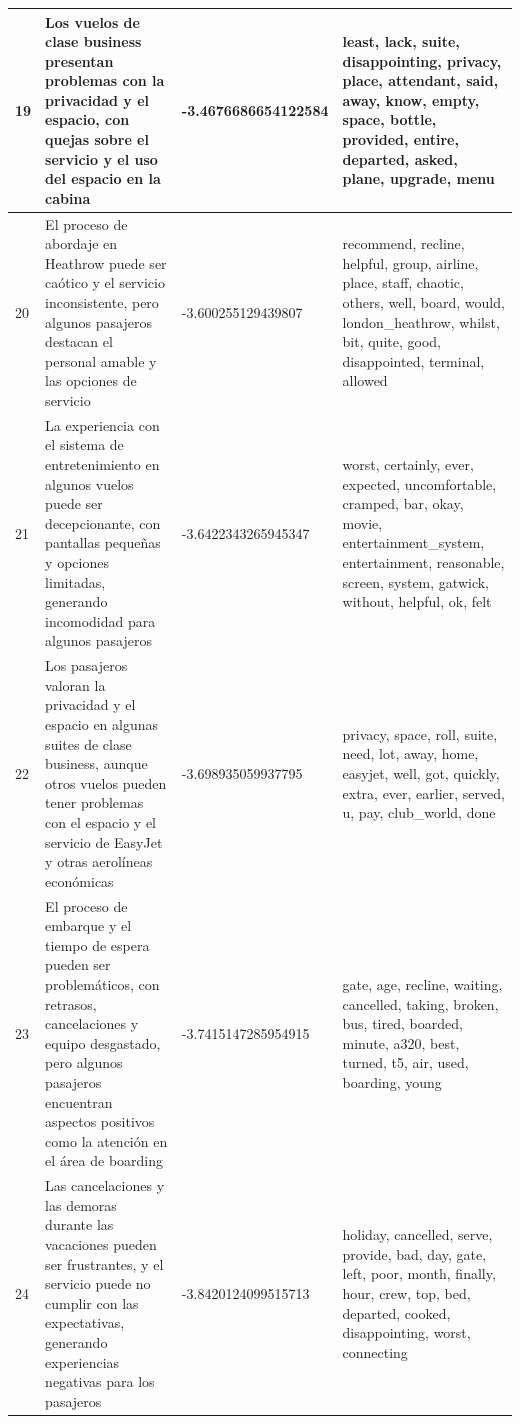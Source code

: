 \documentclass{report}
\begin{document}
{{\begin{longtable}{|p{1cm}|p{4cm}|p{4cm}|p{6cm}|}
                    \hline
                    19 & Los vuelos de clase business presentan problemas con la privacidad y el espacio, con quejas sobre el servicio y el uso del espacio en la cabina & -3.4676686654122584 & least, lack, suite, disappointing, privacy, place, attendant, said, away, know, empty, space, bottle, provided, entire, departed, asked, plane, upgrade, menu \\
                    \hline
                    20 & El proceso de abordaje en Heathrow puede ser caótico y el servicio inconsistente, pero algunos pasajeros destacan el personal amable y las opciones de servicio & -3.600255129439807 & recommend, recline, helpful, group, airline, place, staff, chaotic, others, well, board, would, london\_heathrow, whilst, bit, quite, good, disappointed, terminal, allowed \\
                    \hline
                    21 & La experiencia con el sistema de entretenimiento en algunos vuelos puede ser decepcionante, con pantallas pequeñas y opciones limitadas, generando incomodidad para algunos pasajeros & -3.6422343265945347 & worst, certainly, ever, expected, uncomfortable, cramped, bar, okay, movie, entertainment\_system, entertainment, reasonable, screen, system, gatwick, without, helpful, ok, felt \\
                    \hline
                    22 & Los pasajeros valoran la privacidad y el espacio en algunas suites de clase business, aunque otros vuelos pueden tener problemas con el espacio y el servicio de EasyJet y otras aerolíneas económicas & -3.698935059937795 & privacy, space, roll, suite, need, lot, away, home, easyjet, well, got, quickly, extra, ever, earlier, served, u, pay, club\_world, done \\
                    \hline
                    23 & El proceso de embarque y el tiempo de espera pueden ser problemáticos, con retrasos, cancelaciones y equipo desgastado, pero algunos pasajeros encuentran aspectos positivos como la atención en el área de boarding & -3.7415147285954915 & gate, age, recline, waiting, cancelled, taking, broken, bus, tired, boarded, minute, a320, best, turned, t5, air, used, boarding, young \\
                    \hline
                    24 & Las cancelaciones y las demoras durante las vacaciones pueden ser frustrantes, y el servicio puede no cumplir con las expectativas, generando experiencias negativas para los pasajeros & -3.8420124099515713 & holiday, cancelled, serve, provide, bad, day, gate, left, poor, month, finally, hour, crew, top, bed, departed, cooked, disappointing, worst, connecting \\

\end{longtable}}}
\end{document}
